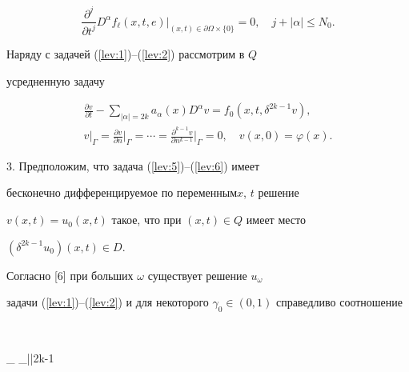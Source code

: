 \begin{equation}\label{lev:4}


\frac{\partial^j}{\partial t^j} D^\alpha f_\ell(x,t,e)


\Big|_{(x,t)\in \partial\Omega\times\{0\}}=0,\quad


j+|\alpha|\leqslant N_0.


\end{equation}





Наряду с задачей (\ref{lev:1})--(\ref{lev:2}) рассмотрим в $Q$


усредненную задачу


\begin{gather}\label{lev:5}


\frac{\partial v}{\partial t}-\sum_{|\alpha|=2k}


a_\alpha(x)D^\alpha v =f_0(x,t,\delta^{2k-1}v),\\


%


\label{lev:6}


v\big|_\Gamma=\frac{\partial v}{\partial


n}\Big|_\Gamma=\dotsb=\frac{\partial^{k-1} v}{\partial


n^{k-1}}\Big|_\Gamma=0,\quad v(x,0)=\varphi(x).


\end{gather}





3.  Предположим, что задача (\ref{lev:5})--(\ref{lev:6}) имеет


бесконечно дифференцируемое по переменным\linebreak $x$, $t$ решение


$v(x,t)=u_0(x,t)$ такое, что при $(x,t)\in Q$ имеет место


$(\delta^{2k-1}u_0)(x,t)\in D$.





Согласно [6] при больших $\omega$ существует решение $u_\omega$


задачи (\ref{lev:1})--(\ref{lev:2}) и для некоторого $\gamma_0\in


(0,1)$ справедливо соотношение


$$




\lim_{\omega\to\infty} \sum_{|\alpha|\leqslant 2k-1}


